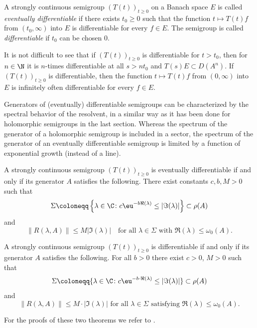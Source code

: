 \begin{definition}\label{def:a2-1.16}
A strongly continuous semigroup $(T(t))_{t \geq 0}$ on a Banach space $E$ is called \emph{eventually differentiable} if there exists $t_0 \geq 0$ such that the function $t \mapsto T(t)f$ from $(t_0,\infty)$ into $E$ is differentiable for every $f \in E$.
The semigroup is called \emph{differentiable} if\/ $t_0$ can be chosen $0$.
\end{definition}

It is not difficult to see that if\/ $(T(t))_{t \geq 0}$ is differentiable for $t > t_{0}$, then for $n \in \N$ it is $n$-times differentiable at all $s > nt_{0}$ and $T(s)E \subset D(A^n)$. 
If\/ $(T(t))_{t\geq 0}$ is differentiable, then the function $t \mapsto T(t)f$ from $(0,\infty)$ into $E$ is infinitely often differentiable for every $f \in E$.

Generators of (eventually) differentiable semigroups 
can be characterized by the spectral behavior of the resolvent,
in a similar way as it has been done for holomorphic semigroups in the last section.
Whereas the spectrum of the generator of a holomorphic semigroup is included in a sector, the spectrum of the generator of an eventually differentiable semigroup is limited by a function of exponential growth (instead of a line).
\begin{theorem}\label{thm:a2-1.17}
A strongly continuous semigroup $(T(t))_{t\geq 0}$ is eventually
differentiable if and only if its generator $A$ satisfies the following.
There exist constants $c, b, M > 0$ such that
\[
    \Sigma \coloneqq \left\{\lambda \in \C \colon 
        c\eu^{-b\Re(\lambda)} \leq \lvert\Im(\lambda)\rvert
    \right\} \subset \rho(A)
\]
and
\[
    \lVert R(\lambda,A) \rVert \leq M \lvert\Im(\lambda)\rvert
    \quad \text{for all } \lambda \in \Sigma 
    \text{ with } \Re(\lambda) \leq \omega_0(A).
\]
\end{theorem}
\begin{theorem}\label{thm:a2-1.18}
A strongly continuous semigroup $(T(t))_{t\geq 0}$ is differentiable if and only if its generator $A$ satisfies the following. 
For all $b>0$ there exist $c>0$, $M>0$ such that
\[
    \Sigma \coloneqq \{\lambda \in \C \colon c\eu^{-b\cdot \Re(\lambda)} 
    	\leq  \lvert \Im(\lambda) \rvert\} \subset \rho(A)
\]
and
\[
    \|R(\lambda,A)\| \leq M\cdot \lvert \Im(\lambda) \rvert \text{ for all } \lambda \in \Sigma \text{ satisfying } \Re(\lambda) \leq \omega_{0}(A).
\]
\end{theorem}
For the proofs of these two theorems we refer to \textcite[Chapter 3, Theorem 4.7 and 4.8]{pazy:1983}.
